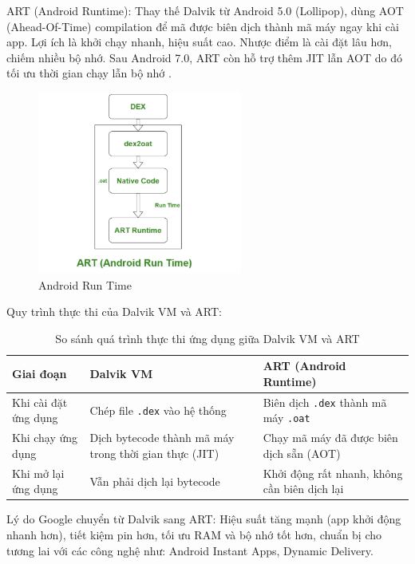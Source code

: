     ART (Android Runtime): Thay thế Dalvik từ Android 5.0 (Lollipop), dùng AOT (Ahead-Of-Time) compilation để mã được biên dịch thành mã máy ngay khi cài app.
    Lợi ích là khởi chạy nhanh, hiệu suất cao.
    Nhược điểm là cài đặt lâu hơn, chiếm nhiều bộ nhớ.
    Sau Android 7.0, ART còn hỗ trợ thêm JIT lẫn AOT do đó tối ưu thời gian chạy lẫn bộ nhớ \cite{art-dalvik}.   
    \begin{figure}[H] 
        \centering
        \includegraphics[width=0.6\textwidth]{images/ART.png}
        \caption{Android Run Time}
        \label{fig:android}
    \end{figure}  
\newpage
    Quy trình thực thi của Dalvik VM và ART:
    \begin{table}[H]
        \centering
        \renewcommand{\arraystretch}{1.5}
        \begin{tabular}{|p{4cm}|p{5cm}|p{5cm}|}
        \hline
        \textbf{Giai đoạn} & \textbf{Dalvik VM} & \textbf{ART (Android Runtime)} \\
        \hline
        Khi cài đặt ứng dụng & Chép file \texttt{.dex} vào hệ thống & Biên dịch \texttt{.dex} thành mã máy \texttt{.oat} \\
        \hline
        Khi chạy ứng dụng & Dịch bytecode thành mã máy trong thời gian thực (JIT) & Chạy mã máy đã được biên dịch sẵn (AOT) \\
        \hline
        Khi mở lại ứng dụng & Vẫn phải dịch lại bytecode & Khởi động rất nhanh, không cần biên dịch lại \\
        \hline
        \end{tabular}
        \caption{So sánh quá trình thực thi ứng dụng giữa Dalvik VM và ART}
        \label{tab:dalvik-vs-art}
        \end{table}
          
    Lý do Google chuyển từ Dalvik sang ART: Hiệu suất tăng mạnh (app khởi động nhanh hơn), tiết kiệm pin hơn, tối ưu RAM và bộ nhớ tốt hơn, chuẩn bị cho tương lai với các công nghệ như: Android Instant Apps, Dynamic Delivery.

